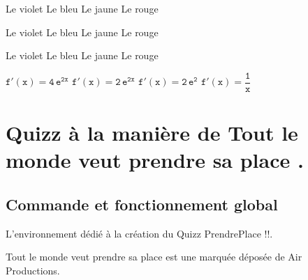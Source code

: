 \documentclass[french,a4paper,11pt]{article}
\begin{document}
\begin{DemoCode}[]
	{Le violet} {Le bleu}
	{Le jaune} {Le rouge}
\end{DemoCode}

\begin{DemoCode}[]
	{Le violet} {Le bleu}
	{Le jaune} {Le rouge}
\end{DemoCode}

\begin{DemoCode}[]
	{Le violet} {Le bleu}
	{Le jaune} {Le rouge}
\end{DemoCode}

\begin{DemoCode}[]
	{$\mathtt{f'(x)=4\,\text{e}^{2x}}$}
	{$\mathtt{f'(x)=2\,\text{e}^{2x}}$}
	{$\mathtt{f'(x)=2\,\text{e}^{2}}$}
	{$\mathtt{f'(x)=\dfrac{1}{x}}$}
\end{DemoCode}

\pagebreak

\section{Quizz à la manière de \og Tout le monde veut prendre sa place \fg.}

\subsection{Commande et fonctionnement global}

\begin{cautionblock}
L'environnement dédié à la création du Quizz \og PrendrePlace \fg{} \motcletex!\QuizzPrendrePlace!.

\smallskip

\textsf{Tout le monde veut prendre sa place\texttrademark} est une marquée déposée de Air Productions.
\end{cautionblock}
\end{document}
